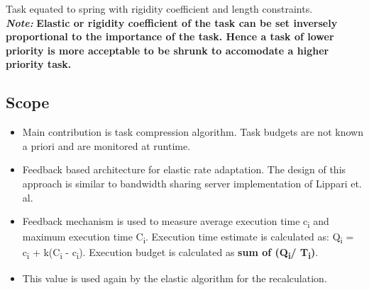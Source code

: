 Task equated to spring with rigidity coefficient and length constraints.\\
\textbf{\textit{Note:}} \textbf{Elastic or rigidity coefficient of the task can be set inversely proportional to the importance of the task. Hence a task of lower priority is more acceptable to be shrunk to accomodate a higher priority task.}\\
\subsection*{Scope}
\begin{itemize}
	\item Main contribution is task compression algorithm. Task budgets are not known a priori and are monitored at runtime.
	\item Feedback based architecture for elastic rate adaptation. The design of this approach is similar to bandwidth sharing server implementation of Lippari et. al. 
	\item Feedback mechanism is used to measure average execution time c\textsubscript{i} and maximum execution time C\textsubscript{i}. Execution time estimate is calculated as:  Q\textsubscript{i} = c\textsubscript{i} + k(C\textsubscript{i} - c\textsubscript{i}). Execution budget is calculated as \textbf{sum of (Q\textsubscript{i}/ T\textsubscript{i})}.
	\item This value is used again by the elastic algorithm for the recalculation.
\end{itemize}
